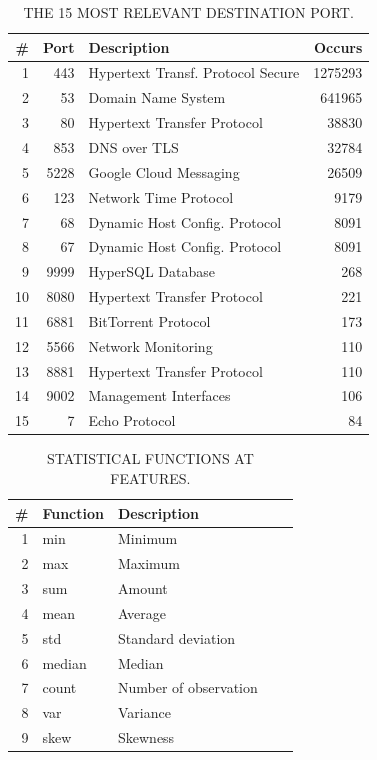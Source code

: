 \begin{table}[h]
  \caption{THE 15 MOST RELEVANT DESTINATION PORT.}
  \centering
  \begin{small}
    \begin{tabular}{rrlr}   \hline
 \# & Port & Description & Occurs  \\ \hline

1 &  443 &  Hypertext Transf. Protocol Secure &  1275293  \\ 
  2 &  53 & Domain Name System & 641965  \\ 
  3 &  80 & Hypertext Transfer Protocol &  38830  \\ 
  4 &  853 & DNS over TLS &  32784  \\ 
  5 &  5228 & Google Cloud Messaging &  26509  \\ 
  6 &  123 & Network Time Protocol & 9179  \\ 
  7 &  68 & Dynamic Host Config. Protocol &  8091  \\ 
  8 &  67 & Dynamic Host Config. Protocol &  8091  \\ 
  9 &  9999 & HyperSQL Database &  268  \\ 
  10 & 8080 & Hypertext Transfer Protocol & 221  \\ 
  11 & 6881 & BitTorrent Protocol & 173  \\ 
  12 & 5566 & Network Monitoring & 110  \\ 
  13 & 8881 & Hypertext Transfer Protocol & 110  \\ 
  14 & 9002 & Management Interfaces & 106  \\ 
  15 & 7 & Echo Protocol & 84  \\ 
   \hline

 \end{tabular}
 \end{small}
 \label{tab:port}
 \end{table}


\begin{table}[ht]
  \caption{STATISTICAL FUNCTIONS AT FEATURES.}
  \centering
  \begin{small}
    \begin{tabular}{rllrr}   \hline
 \# & Function & Description\\ \hline

1 &  min &  Minimum\\ 
  2 &  max & Maximum\\ 
  3 &  sum & Amount\\ 
  4 &  mean & Average\\ 
  5 &  std & Standard deviation \\ 
  6 &  median & Median\\ 
  7 &  count & Number of observation\\ 
  8 &  var & Variance\\ 
  9 &  skew & Skewness \\ 
   \hline

 \end{tabular}
 \end{small}
 \label{tab:function}
 \end{table}


